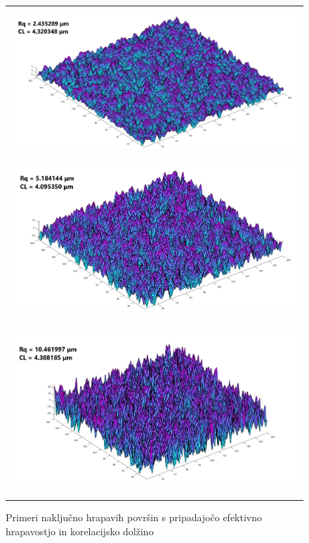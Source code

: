 \documentclass[a4paper,twoside,openright,12pt,slovene]{book}
\begin{document}
\begin{figure}[htp!]
\centering

\begin{tabular}{c}
  \includegraphics[height=55mm]{Slike/RQ2-5.png} \\
  \includegraphics[height=58mm]{Slike/RQ5.png} \\
  \includegraphics[height=65mm]{Slike/RQ10.png} \\
\end{tabular}

\caption{Primeri naključno hrapavih površin s pripadajočo efektivno hrapavostjo in korelacijsko dolžino}
\end{figure}
\end{document}
